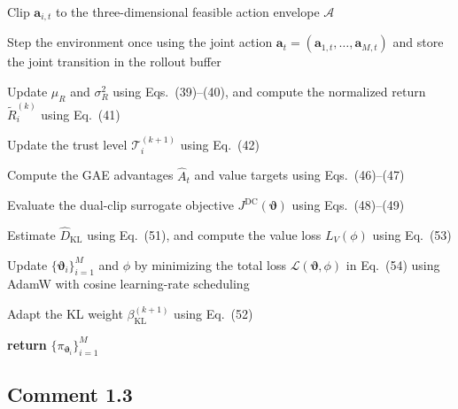 \documentclass[11pt]{article}
\begin{document}
\begin{tcolorbox}[enhanced,breakable,colback=white,colframe=addblue!55,
boxrule=0.6pt,arc=2pt,left=9pt,right=9pt,top=7pt,bottom=7pt]
\begin{algorithm}[H]
\begin{algorithmic}[1]
      \STATE Clip $\mathbf{a}_{i,t}$ to the three-dimensional feasible
      action envelope $\mathcal{A}$

    \ENDFOR

    \STATE Step the environment once using the joint action
    $\mathbf{a}_t=(\mathbf{a}_{1,t},\ldots,\mathbf{a}_{M,t})$
    and store the joint transition in the rollout buffer

  \ENDFOR


  \STATE Update $\mu_R$ and $\sigma_R^2$ using Eqs.~(39)--(40),
  and compute the normalized return $\widetilde{R}_i^{(k)}$
  using Eq.~(41)

  \STATE Update the trust level
  $\mathcal{T}_i^{(k+1)}$ using Eq.~(42)


  \STATE Compute the GAE advantages $\hat{A}_t$ and value targets
  using Eqs.~(46)--(47)


    \STATE Evaluate the dual-clip surrogate objective
    $J^{\mathrm{DC}}(\boldsymbol{\vartheta})$
    using Eqs.~(48)--(49)

    \STATE Estimate $\widehat{D}_{\mathrm{KL}}$ using Eq.~(51),
    and compute the value loss $L_V(\phi)$ using Eq.~(53)

    \STATE Update $\{\boldsymbol{\vartheta}_i\}_{i=1}^{M}$ and $\phi$
    by minimizing the total loss
    $\mathcal{L}(\boldsymbol{\vartheta},\phi)$ in Eq.~(54)
    using AdamW with cosine learning-rate scheduling

  \ENDFOR

  \STATE Adapt the KL weight
  $\beta_{\mathrm{KL}}^{(k+1)}$ using Eq.~(52)

\ENDFOR

\STATE \textbf{return}
$\{\pi_{\boldsymbol{\vartheta}_i}\}_{i=1}^{M}$

\end{algorithmic}
\end{algorithm}
\end{tcolorbox}



\subsection*{Comment 1.3}
\end{document}
